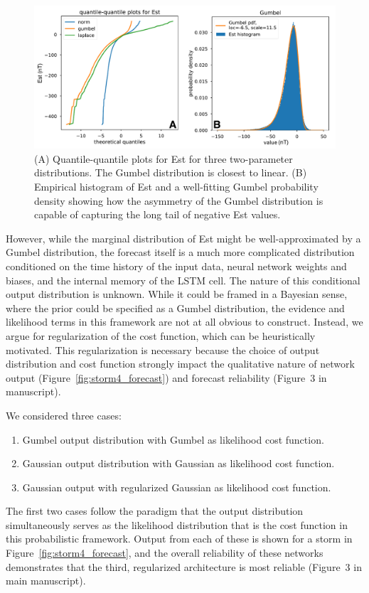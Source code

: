 \documentclass{agujournal2018}
\begin{document}
\begin{figure}[htbp]
   \centering
   \includegraphics[width=1.0\textwidth]{figures/supplement/est_stats.pdf} %
   \caption{(A) Quantile-quantile plots for Est for three two-parameter distributions. The Gumbel distribution is closest to linear. (B) Empirical histogram of Est and a well-fitting Gumbel probability density showing how the asymmetry of the Gumbel distribution is capable of capturing the long tail of negative Est values.}
   \label{fig:est_stats}
\end{figure}

However, while the marginal distribution of Est might be well-approximated by a Gumbel distribution, the forecast itself is a much more complicated distribution conditioned on the time history of the input data, neural network weights and biases, and the internal memory of the LSTM cell. The nature of this conditional output distribution is unknown. While it could be framed in a Bayesian sense, where the prior could be specified as a Gumbel distribution, the evidence and likelihood terms in this framework are not at all obvious to construct. Instead, we argue for regularization of the cost function, which can be heuristically motivated. This regularization is necessary because the choice of output distribution and cost function strongly impact the qualitative nature of network output (Figure~\ref{fig:storm4_forecast}) and forecast reliability (Figure~3 in manuscript).

We considered three cases:
\begin{enumerate}
    \item Gumbel output distribution with Gumbel as likelihood cost function.
    \item Gaussian output distribution with Gaussian as likelihood cost function.
    \item Gaussian output with regularized Gaussian as likelihood cost function.
\end{enumerate}
The first two cases follow the paradigm that the output distribution simultaneously serves as the likelihood distribution that is the cost function in this probabilistic framework. Output from each of these is shown for a storm in Figure~\ref{fig:storm4_forecast}, and the overall reliability of these networks demonstrates that the third, regularized architecture is most reliable (Figure~3 in main manuscript).
\end{document}
